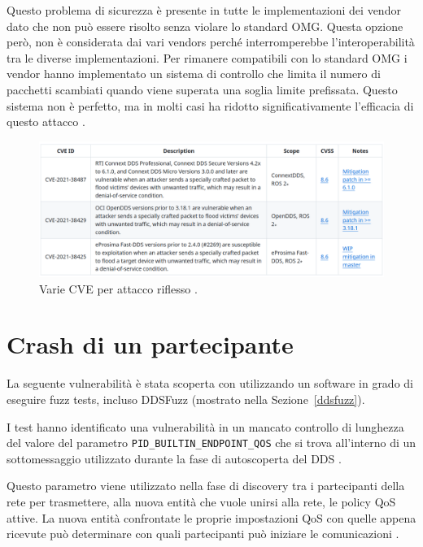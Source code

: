 Questo problema di sicurezza è presente in tutte le implementazioni 
dei vendor dato che non può essere risolto senza violare lo 
standard OMG. Questa opzione però, non è considerata dai vari 
vendors perché interromperebbe l'interoperabilità tra le 
diverse implementazioni.
Per rimanere compatibili con lo standard OMG i vendor hanno 
implementato un sistema di controllo che limita il numero 
di pacchetti scambiati quando viene superata una soglia limite
prefissata. Questo sistema non è perfetto, ma in molti casi ha 
ridotto significativamente l'efficacia di questo attacco \cite{mayoral2022robot}.

\begin{figure}[H]
    \centering
    \includegraphics[width=15.2cm, keepaspectratio]{img/CVErecoinnassance.png}
    \caption{Varie CVE per attacco riflesso \cite{mayoral2022robot}.}
    \label{CVErecoinnassance}
\end{figure}


\section{Crash di un partecipante}
La seguente vulnerabilità è stata scoperta con utilizzando 
un software in grado di eseguire fuzz tests, 
incluso DDSFuzz (mostrato nella Sezione~\ref{ddsfuzz}).

I test hanno identificato una vulnerabilità in un mancato 
controllo di lunghezza del valore del parametro 
\texttt{PID\_BUILTIN\_ENDPOINT\_QOS} che si trova all'interno di 
un sottomessaggio utilizzato durante la fase di autoscoperta
del DDS \cite{mayoral2022robot}. 

Questo parametro viene 
utilizzato nella fase di discovery
tra i partecipanti della rete per trasmettere, 
alla nuova entità che vuole unirsi alla rete, le policy
QoS attive. La nuova entità confrontate 
le proprie impostazioni QoS con quelle appena ricevute
può determinare con quali partecipanti può iniziare le 
comunicazioni \cite{ddsrtps}.

